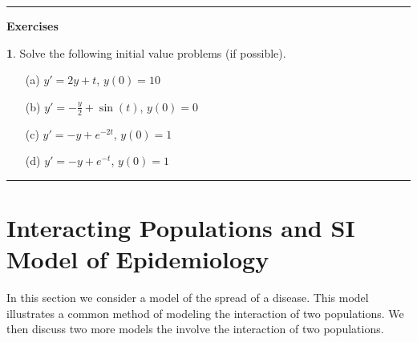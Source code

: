 \documentclass[reqno]{immbook}
\newcommand{\ds}{\displaystyle}
\numberwithin{equation}{chapter}
\numberwithin{question}{section}
\numberwithin{theorem}{chapter}
\numberwithin{figure}{chapter}
\theoremstyle{definition}
\newtheorem{exercise}{}[section]
\newenvironment{exercises}%
{%
\medskip\hrule\medskip\noindent\textbf{Exercises}%
}%
{%
\medskip\hrule
}
\begin{document}
\begin{exercises}
\begin{exercise}
Solve the following initial value problems (if possible).
\begin{enumerate}
\item[(a)] $\ds y' = 2y+t$, \hspace{0.25cm} $y(0)=10$
\item[(b)] $\ds y' = -\frac{y}{2} + \sin(t)$, \hspace{0.25cm} $y(0)=0$
\item[(c)] $\ds y' = -y + e^{-2t}$, \hspace{0.25cm} $y(0)=1$
\item[(d)] $\ds y' = -y + e^{-t}$, \hspace{0.25cm} $y(0)=1$
\end{enumerate}
\end{exercise}
\end{exercises}


\newpage

\section{Interacting Populations and SI Model of Epidemiology}

In this section we consider a model of the spread of a disease.
This model illustrates a common method of
modeling the interaction of two populations.
We then discuss two more models the involve the
interaction of two populations.
\end{document}
